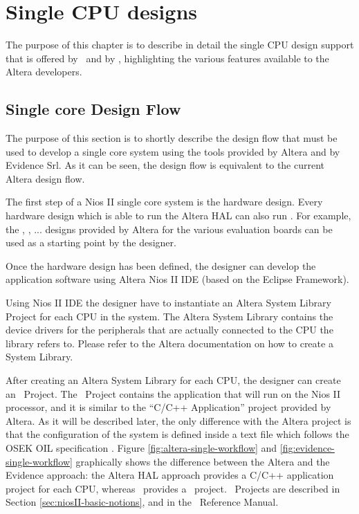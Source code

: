 \chapter[Single CPU designs]{Single CPU designs}
\label{cha:singlecpu}

The purpose of this chapter is to describe in detail the single CPU design
support that is offered by \ee\ and by \rtd, highlighting the various
features available to the Altera developers.




\section[Single core Design Flow]
{Single core Design Flow}
\label{sec:singlecore-designflow}


The purpose of this section is to shortly describe the design flow
that must be used to develop a single core system using the tools
provided by Altera and by Evidence Srl. As it can be seen, the design
flow is equivalent to the current Altera design flow.

The first step of a Nios II single core system is the hardware
design. Every hardware design which is able to run the Altera HAL can
also run \ee. For example, the ,
, ... designs provided by Altera for the various
evaluation boards can be used as a starting point by the designer.

Once the hardware design has been defined, the designer can develop
the application software using Altera Nios II IDE (based on the Eclipse
Framework).

Using Nios II IDE the designer have to instantiate an Altera System
Library Project for each CPU in the system. The Altera System Library
contains the device drivers for the peripherals that are actually
connected to the CPU the library refers to. Please refer to the Altera
documentation on how to create a System Library.

After creating an Altera System Library for each CPU, the designer can
create an \rtd\ Project. The \rtd\ Project contains the application
that will run on the Nios II processor, and it is similar to the
``C/C++ Application'' project provided by Altera. As it will be
described later, the only difference with the Altera project is that
the configuration of the system is defined inside a text file which
follows the OSEK OIL specification \cite{OSEKOIL}. Figure
\ref{fig:altera-single-workflow} and
\ref{fig:evidence-single-workflow} graphically shows the difference
between the Altera and the Evidence approach: the Altera HAL approach
provides a C/C++ application project for each CPU, whereas \ee\
provides a \rtd\ project. \rtd\ Projects are described in Section
\ref{sec:niosII-basic-notions}, and in the \rtd\ Reference Manual.

